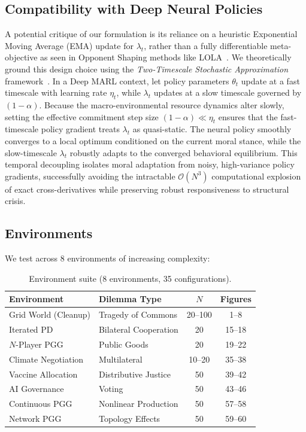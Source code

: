 \documentclass{article}
\begin{document}
\subsection{Compatibility with Deep Neural Policies}
\label{sec:bridge}
A potential critique of our formulation is its reliance on a heuristic Exponential Moving Average (EMA) update for $\lambda_t$, rather than a fully differentiable meta-objective as seen in Opponent Shaping methods like LOLA~\cite{foerster2018learning}. 
We theoretically ground this design choice using the \textit{Two-Timescale Stochastic Approximation} framework~\cite{borkar1997stochastic}. 
In a Deep MARL context, let policy parameters $\theta_t$ update at a fast timescale with learning rate $\eta_t$, while $\lambda_t$ updates at a slow timescale governed by $(1-\alpha)$. 
Because the macro-environmental resource dynamics alter slowly, setting the effective commitment step size $(1-\alpha) \ll \eta_t$ ensures that the fast-timescale policy gradient treats $\lambda_t$ as quasi-static. 
The neural policy smoothly converges to a local optimum conditioned on the current moral stance, while the slow-timescale $\lambda_t$ robustly adapts to the converged behavioral equilibrium. 
This temporal decoupling isolates moral adaptation from noisy, high-variance policy gradients, successfully avoiding the intractable $\mathcal{O}(N^3)$ computational explosion of exact cross-derivatives while preserving robust responsiveness to structural crisis.

\subsection{Environments}

We test across 8 environments of increasing complexity:

\begin{table}[h]
\centering
\caption{Environment suite (8 environments, 35 configurations).}
\label{tab:envs}
\begin{tabular}{llcc}
\toprule
Environment & Dilemma Type & $N$ & Figures \\
\midrule
Grid World (Cleanup) & Tragedy of Commons & 20--100 & 1--8 \\
Iterated PD & Bilateral Cooperation & 20 & 15--18 \\
$N$-Player PGG & Public Goods & 20 & 19--22 \\
Climate Negotiation & Multilateral & 10--20 & 35--38 \\
Vaccine Allocation & Distributive Justice & 50 & 39--42 \\
AI Governance & Voting & 50 & 43--46 \\
Continuous PGG & Nonlinear Production & 50 & 57--58 \\
Network PGG & Topology Effects & 50 & 59--60 \\
\bottomrule
\end{tabular}
\end{table}
\end{document}
